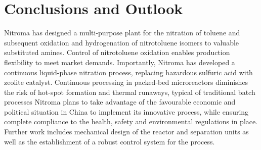 \section{Conclusions and Outlook}
\label{sec:conclu}
Nitroma has designed a multi-purpose plant for the nitration of toluene and subsequent oxidation and hydrogenation of nitrotoluene isomers to valuable substituted amines.
Control of nitrotoluene oxidation enables production flexibility to meet market demands.
Importantly, Nitroma has developed a continuous liquid-phase nitration process, replacing hazardous sulfuric acid with zeolite catalyst.
Continuous processing in packed-bed microreactors diminishes the risk of hot-spot formation and thermal runaways, typical of traditional batch processes
Nitroma plans to take advantage of the favourable economic and political situation in China to implement its innovative process, while ensuring complete compliance to the health, safety and environmental regulations in place.
Further work includes mechanical design of the reactor and separation units as well as the establishment of a robust control system for the process. 
